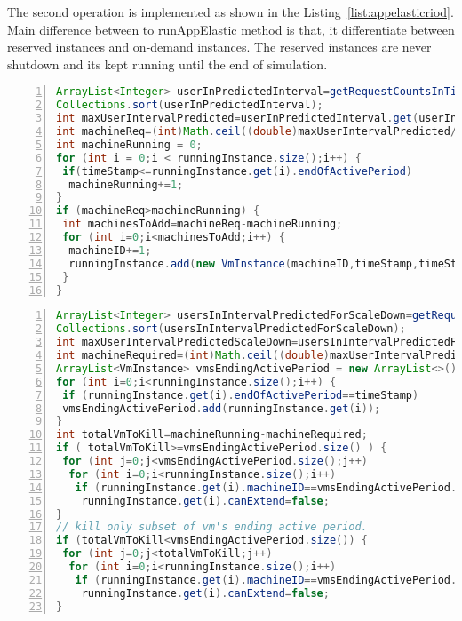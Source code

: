The second operation is implemented as shown in the Listing~\ref{list:appelasticriod}. Main difference between to runAppElastic method is that, it differentiate between reserved instances and on-demand instances. The reserved instances are never shutdown and its kept running until the end of simulation.
\begin{lstlisting}[language=java,caption=AppElastic Scaleup,label=list:appelasticscaleup,numbers=left,frame=single,fontadjust=true,breaklines,basicstyle=\small]
ArrayList<Integer> userInPredictedInterval=getRequestCountsInTimeRange(timeStamp, timeStamp + scaleUpLookAhead,false);
Collections.sort(userInPredictedInterval);
int maxUserIntervalPredicted=userInPredictedInterval.get(userInPredictedInterval.size() - 1);
int machineReq=(int)Math.ceil((double)maxUserIntervalPredicted/numberOfUserPerInstance);
int machineRunning = 0;
for (int i = 0;i < runningInstance.size();i++) {
 if(timeStamp<=runningInstance.get(i).endOfActivePeriod)
  machineRunning+=1;
}
if (machineReq>machineRunning) {
 int machinesToAdd=machineReq-machineRunning;
 for (int i=0;i<machinesToAdd;i++) {
  machineID+=1;
  runningInstance.add(new VmInstance(machineID,timeStamp,timeStamp+billingPeriod,timeStamp+timeTakenToActive, (timeStamp+billingPeriod)-timetakenToShutdown));
 }
}
\end{lstlisting}
\begin{lstlisting}[language=java,caption=AppElastic Scaledown,label=list:appelasticscaledown,numbers=left,frame=single,fontadjust=true,breaklines,basicstyle=\small]
ArrayList<Integer> usersInIntervalPredictedForScaleDown=getRequestCountsInTimeRange(timeStamp,timeStamp+ scaleDownLookAhead,true);
Collections.sort(usersInIntervalPredictedForScaleDown);
int maxUserIntervalPredictedScaleDown=usersInIntervalPredictedForScaleDown.get(usersInIntervalPredictedForScaleDown.size()-1);
int machineRequired=(int)Math.ceil((double)maxUserIntervalPredictedScaleDown/numberOfUserPerInstance);
ArrayList<VmInstance> vmsEndingActivePeriod = new ArrayList<>();
for (int i=0;i<runningInstance.size();i++) {
 if (runningInstance.get(i).endOfActivePeriod==timeStamp)
 vmsEndingActivePeriod.add(runningInstance.get(i));
}
int totalVmToKill=machineRunning-machineRequired;
if ( totalVmToKill>=vmsEndingActivePeriod.size() ) {
 for (int j=0;j<vmsEndingActivePeriod.size();j++)
  for (int i=0;i<runningInstance.size();i++)
   if (runningInstance.get(i).machineID==vmsEndingActivePeriod.get(j).machineID)
    runningInstance.get(i).canExtend=false;
}
// kill only subset of vm's ending active period.
if (totalVmToKill<vmsEndingActivePeriod.size()) {
 for (int j=0;j<totalVmToKill;j++)
  for (int i=0;i<runningInstance.size();i++)
   if (runningInstance.get(i).machineID==vmsEndingActivePeriod.get(j).machineID)
    runningInstance.get(i).canExtend=false;
}
\end{lstlisting}
